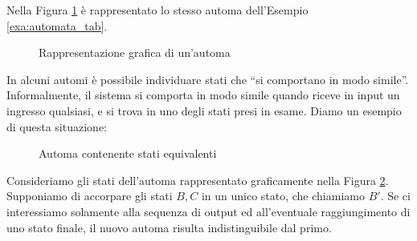 \begin{example}
    Nella Figura \ref{fig:automata} è rappresentato lo stesso automa dell'Esempio \ref{exa:automata_tab}.
    \begin{figure}[hb]
        \centering
        \caption{Rappresentazione grafica di un'automa}
        \label{fig:automata}
    \end{figure}
\end{example}
In alcuni automi è possibile individuare stati che ``si comportano in modo simile''. Informalmente, il sistema si comporta in modo simile quando riceve in input un ingresso qualsiasi, e si trova in uno degli stati presi in esame. Diamo un esempio di questa situazione:
\begin{example}
    \begin{figure}[b]
        \centering
        \caption{Automa contenente stati equivalenti}
        \label{fig:automata_eq}
    \end{figure}
    Consideriamo gli stati dell'automa rappresentato graficamente nella Figura \ref{fig:automata_eq}. Supponiamo di accorpare gli stati $B,C$ in un unico stato, che chiamiamo $B'$. Se ci interessiamo solamente alla sequenza di output ed all'eventuale raggiungimento di uno stato finale, il nuovo automa risulta indistinguibile dal primo.
\end{example}
